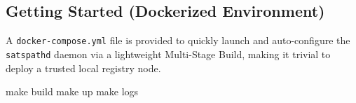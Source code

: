 \documentclass[
]{article}
\newenvironment{Shaded}{}{}
\newcommand{\FunctionTok}[1]{\textcolor[rgb]{0.02,0.16,0.49}{#1}}
\newcommand{\NormalTok}[1]{#1}
\begin{document}
\hypertarget{getting-started-dockerized-environment}{%
\subsection{Getting Started (Dockerized
Environment)}\label{getting-started-dockerized-environment}}

A \texttt{docker-compose.yml} file is provided to quickly launch and
auto-configure the \texttt{satspathd} daemon via a lightweight
Multi-Stage Build, making it trivial to deploy a trusted local registry
node.

\begin{Shaded}
\begin{Highlighting}[]
\FunctionTok{make}\NormalTok{ build}
\FunctionTok{make}\NormalTok{ up}
\FunctionTok{make}\NormalTok{ logs}
\end{Highlighting}
\end{Shaded}
\end{document}
